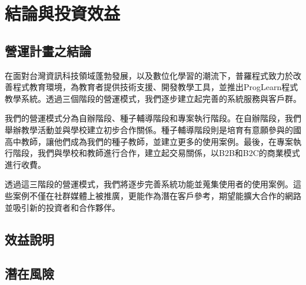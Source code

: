 \section{結論與投資效益}

\subsection{營運計畫之結論}

在面對台灣資訊科技領域蓬勃發展，以及數位化學習的潮流下，普羅程式致力於改善程式教育環境，為教育者提供技術支援、開發教學工具，並推出ProgLearn程式教學系統。透過三個階段的營運模式，我們逐步建立起完善的系統服務與客戶群。

我們的營運模式分為自辦階段、種子輔導階段和專案執行階段。在自辦階段，我們舉辦教學活動並與學校建立初步合作關係。種子輔導階段則是培育有意願參與的國高中教師，讓他們成為我們的種子教師，並建立更多的使用案例。最後，在專案執行階段，我們與學校和教師進行合作，建立起交易關係，以B2B和B2C的商業模式進行收費。

透過這三階段的營運模式，我們將逐步完善系統功能並蒐集使用者的使用案例。這些案例不僅在社群媒體上被推廣，更能作為潛在客戶參考，期望能擴大合作的網路並吸引新的投資者和合作夥伴。
\subsection{效益說明}

\subsection{潛在風險}